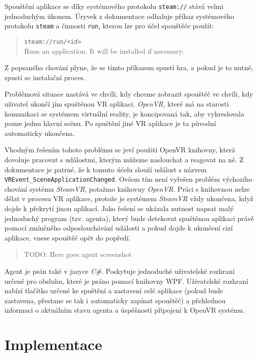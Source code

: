 Spouštění aplikace se díky systémového protokolu \texttt{steam://} stává
velmi jednoduchým úkonem. Úryvek z dokumentace odhaluje příkaz
systémového protokolu \texttt{steam} a činnosti \texttt{run}, kterou lze
pro účel spouštěče použít:

\begin{quote}
\texttt{steam://run/\textless{}id\textgreater{}}\\
Runs an application. It will be installed if necessary.
\end{quote}

Z popsaného chování plyne, že se tímto příkazem spustí hra, a pokud je
to nutné, spustí se instalační proces. 

Problémová situace nastává ve
chvíli, kdy chceme zobrazit spouštěč ve chvíli, kdy uživatel
ukončí jím spuštěnou VR aplikaci. \emph{OpenVR}, které má na starosti
komunikaci se systémem virtuální reality, je koncipovaná tak, 
aby vykreslovala pouze jednu hlavní scénu. Po spuštění jiné VR aplikace 
je ta původní automaticky ukončena. 

Vhodným řešením tohoto problému se jeví použití OpenVR knihovny, která
dovoluje pracovat s událostmi, kterým můžeme naslouchat a reagovat na
ně. Z dokumentace je patrné, že k tomuto účelu slouží událost s názvem
\texttt{VREvent\_SceneApplicationChanged}. Ovšem tím není vyřešen
problém výchozího chování systému \emph{SteamVR}, potažmo knihovny
\emph{OpenVR}. Práci s knihovnou nelze dělat v procesu VR aplikace,
protože je systémem \emph{SteamVR} vždy ukončena, když dojde k 
překrytí jinou aplikací. Jako řešení se ukázala nutnost napsat malý 
jednoduchý program (tzv. agenta), který bude detekovat spuštěnou aplikaci právě
pomocí zmíněného odposlouchávání události a pokud dojde k ukončení cizí 
aplikace, vnese spouštěč opět do popředí.

\begin{quote}
TODO: Here goes agent screenshot
\end{quote}

Agent je psán také v jazyce \emph{C\#}. Poskytuje jednoduché uživatelské
rozhraní určené pro obsluhu, které je psáno pomocí knihovny WPF.
Uživatelské rozhraní nabízí tlačítko určené ke spuštění a zastavení celé
aplikace (pokud bude zastavena, přestane se tak i automaticky zapínat
spouštěč) a přehlednou informaci o aktuálním stavu agenta a úspěšnosti
připojení k OpenVR systému.

\section{Implementace}\label{implementace}

